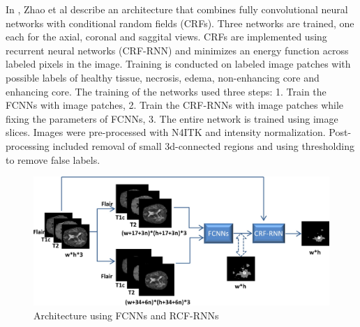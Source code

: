 \documentclass[letterpaper, 10 pt, conference]{ieeeconf}  %
\begin{document}
In \cite{zhao_deep_2018}, Zhao et al describe an architecture that combines fully convolutional neural networks with conditional random fields (CRFs). Three networks are trained, one each for the axial, coronal and saggital views. CRFs are implemented using recurrent neural networks (CRF-RNN) and minimizes an energy function across labeled pixels in the image. Training is conducted on labeled image patches with possible labels of healthy tissue, necrosis, edema, non-enhancing core and enhancing core. The training of the networks used three steps: 1. Train the FCNNs with image patches, 2. Train the CRF-RNNs with image patches while fixing the parameters of FCNNs, 3. The entire network is trained using image slices. Images were pre-processed with N4ITK and intensity normalization. Post-processing included removal of small 3d-connected regions and using thresholding to remove false labels.

\begin{figure}
  \includegraphics[width=\linewidth]{images/zhao1.jpg}
  \caption{Architecture using FCNNs and RCF-RNNs \cite{zhao_deep_2018}}
  \label{fig:zhao1}
\end{figure}
\end{document}
